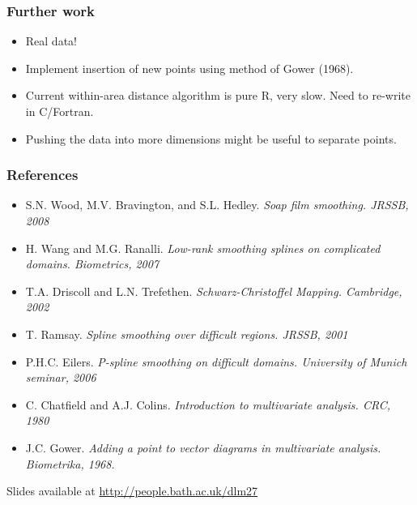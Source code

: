 \documentclass[ignorenonframetext]{beamer} %
\newcommand{\bi}{\begin{itemize}}
\newcommand{\ei}{\end{itemize}}
\begin{document}
\begin{frame}
	\frametitle{Further work}
       \bi
         \item Real data!
         \item Implement insertion of new points using method of Gower (1968).
         \item Current within-area distance algorithm is pure R, very slow. Need to re-write in C/Fortran.
         \item Pushing the data into more dimensions might be useful to separate points.  
        \ei
\end{frame}




\begin{frame}
	\frametitle{References}
       \bi
         \item S.N. Wood, M.V. Bravington, and S.L. Hedley. \emph{Soap film smoothing. JRSSB, 2008}
         \item H. Wang and M.G. Ranalli. \emph{Low-rank smoothing splines on complicated domains. Biometrics, 2007}
         \item T.A. Driscoll and L.N. Trefethen. \emph{Schwarz-Christoffel Mapping. Cambridge, 2002}
         \item T. Ramsay. \emph{Spline smoothing over difficult regions. JRSSB, 2001}
         \item P.H.C. Eilers. \emph{P-spline smoothing on difficult domains. University of Munich seminar, 2006}
	\item C. Chatfield and A.J. Colins. \emph{Introduction to multivariate analysis. CRC, 1980}
	\item J.C. Gower. \emph{Adding a point to vector diagrams in multivariate analysis. Biometrika, 1968.}
        \ei
        Slides available at \url{http://people.bath.ac.uk/dlm27}
\end{frame}
\end{document}
